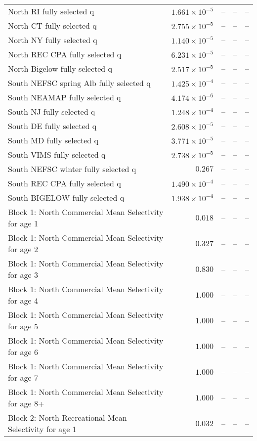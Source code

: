\documentclass[
]{article}
\begin{document}
\begin{landscape}
\begin{longtable}[t]{lrrrr}
North RI fully selected q & $1.661\times 10^{-5}$ & -- & -- & --\\
North CT fully selected q & $2.755\times 10^{-5}$ & -- & -- & --\\
North NY fully selected q & $1.140\times 10^{-5}$ & -- & -- & --\\
\addlinespace
North REC CPA fully selected q & $6.231\times 10^{-5}$ & -- & -- & --\\
North Bigelow fully selected q & $2.517\times 10^{-5}$ & -- & -- & --\\
South NEFSC spring Alb fully selected q & $1.425\times 10^{-4}$ & -- & -- & --\\
South NEAMAP fully selected q & $4.174\times 10^{-6}$ & -- & -- & --\\
South NJ fully selected q & $1.248\times 10^{-4}$ & -- & -- & --\\
\addlinespace
South DE fully selected q & $2.608\times 10^{-5}$ & -- & -- & --\\
South MD fully selected q & $3.771\times 10^{-5}$ & -- & -- & --\\
South VIMS fully selected q & $2.738\times 10^{-5}$ & -- & -- & --\\
South NEFSC winter fully selected q & $0.267$ & -- & -- & --\\
South REC CPA fully selected q & $1.490\times 10^{-4}$ & -- & -- & --\\
\addlinespace
South BIGELOW fully selected q & $1.938\times 10^{-4}$ & -- & -- & --\\
Block 1: North Commercial Mean Selectivity for age 1 & $0.018$ & -- & -- & --\\
Block 1: North Commercial Mean Selectivity for age 2 & $0.327$ & -- & -- & --\\
Block 1: North Commercial Mean Selectivity for age 3 & $0.830$ & -- & -- & --\\
Block 1: North Commercial Mean Selectivity for age 4 & $1.000$ & -- & -- & --\\
\addlinespace
Block 1: North Commercial Mean Selectivity for age 5 & $1.000$ & -- & -- & --\\
Block 1: North Commercial Mean Selectivity for age 6 & $1.000$ & -- & -- & --\\
Block 1: North Commercial Mean Selectivity for age 7 & $1.000$ & -- & -- & --\\
Block 1: North Commercial Mean Selectivity for age 8+ & $1.000$ & -- & -- & --\\
Block 2: North Recreational Mean Selectivity for age 1 & $0.032$ & -- & -- & --\\

\end{longtable}
\end{landscape}
\end{document}
